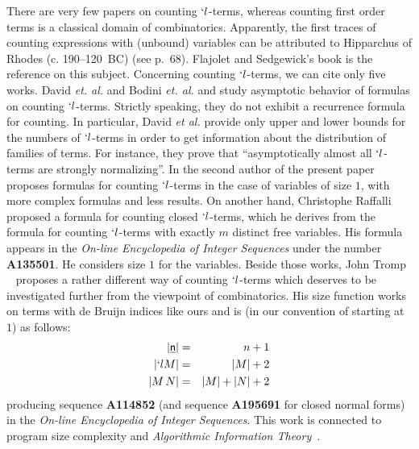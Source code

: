 \documentclass{jfp1}
\newcommand{\Var}[1]{\underline{\mathsf{#1}}}
\begin{document}
There are very few papers on counting $`l$-terms, whereas counting first order
terms is a classical domain of combinatorics. Apparently, the first traces of
counting expressions with (unbound) variables can be attributed to Hipparchus of
Rhodes (c. 190--120~BC) (see \cite{flajolet08:_analy_combin} p.~68).  Flajolet and
Sedgewick's book \cite{flajolet08:_analy_combin} is the reference on this subject.
Concerning counting $`l$-terms, we can cite only five works.  \ifJFP David
\emph{et. al.}  and Bodini \emph{et. al.}
 \else \cite{DBLP:journals/corr/abs-0903-5505} and
\cite{gittenberger-2011-ltbuh} \fi study asymptotic behavior of formulas on counting
$`l$-terms.  Strictly speaking, they do not exhibit a recurrence formula for
counting.  In particular, David \emph{et al.} \ifJFP
{} \else
\cite{DBLP:journals/corr/abs-0903-5505} \fi provide only upper and lower bounds for
the numbers of $`l$-terms in order to get information about the distribution of
families of terms. For instance, they prove that ``asymptotically almost all
$`l$-terms are strongly normalizing''.  In \cite{DBLP:journals/tcs/Lescanne13} the
second author of the present paper proposes formulas for counting $`l$-terms in the
case of variables of size $1$, with more complex formulas and less results.  On
another hand, Christophe Raffalli proposed a formula for counting closed $`l$-terms,
which he derives from the formula for counting $`l$-terms with exactly $m$ distinct
free variables.  His formula appears in the \emph{On-line Encyclopedia of Integer
  Sequences} under the number \textbf{A135501}.  He considers size $1$ for the
variables.  Beside those works, John Tromp \ifJFP
{} \else ~\cite{DBLP:conf/dagstuhl/Tromp06} \fi
proposes a rather different way of counting $`l$-terms which deserves to be
investigated further from the viewpoint of combinatorics.  His size function works on
terms with de Bruijn indices like ours and is (in our convention of starting at $1$)
as follows:
  \begin{eqnarray*}
    |\Var{n}| &=& n +1\\
    |`l M | &=& |M| + 2\\
    |M\,N| &=& |M| + |N|+2
  \end{eqnarray*}
  producing sequence \textbf{A114852} (and sequence \textbf{A195691} for closed
  normal forms) in the \emph{On-line Encyclopedia of Integer Sequences}.  This work
  is connected to program size complexity and \emph{Algorithmic Information
    Theory}~\cite{261084}.
\end{document}
